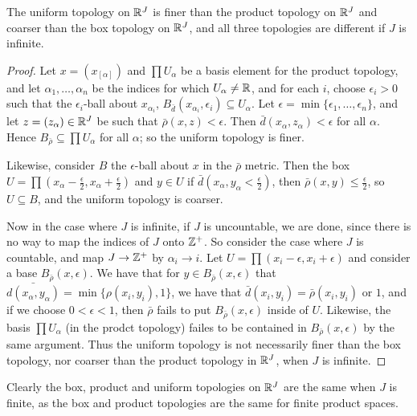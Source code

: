 \begin{theorem}\label{2.2.8}
    The uniform topology on $\mathbb{R}^J$ is finer than the product topology on  $\mathbb{R}^J$ and coarser than
    the box topology on  $\mathbb{R}^J$, and all three topologies are different if  $J$ is infinite.
\end{theorem}
\begin{proof}
    Let $x=(x_[\alpha])$ and $\prod{U_{\alpha}}$ be a basis element for the product topology, and
    let $\alpha_1 ,\dots, \alpha_n$ be the indices for which $U_{\alpha} \neq \mathbb{R}$, and for each $i$,
    choose  $\epsilon_i>0$ such that the  $\epsilon_i$-ball about  $x_{\alpha_i}$,
    $B_{\bar{d}}(x_{\alpha_i},\epsilon_i) \subseteq U_{\alpha}$. Let $\epsilon=\min\{\epsilon_1,
    \dots, \epsilon_n\}$, and let $z=(z_{\alpha}) \in \mathbb{R}^J$ be such that $\bar{\rho}(x,z)<\epsilon$.
    Then $\bar{d}(x_{\alpha},z_{\alpha})<\epsilon$ for all $\alpha$. Hence  $B_{\bar{\rho}}
    \subseteq \prod{U_{\alpha}}$ for all $\alpha$; so the uniform topology is finer.

    Likewise, consider $B$ the $\epsilon$-ball about  $x$ in the  $\bar{\rho}$ metric. Then the box
    $U=\prod{(x_{\alpha}-\frac{\epsilon}{2},x_{\alpha}+\frac{\epsilon}{2})}$ and $y \in U$ if
    $\bar{d}(x_{\alpha},y_{\alpha}<\frac{\epsilon}{2})$, then $\bar {\rho}(x,y) \leq
    \frac{\epsilon}{2}$, so $U \subseteq B$, and the uniform topology is coarser.

    Now in the case where  $J$ is infinite, if  $J$ is uncountable, we are done, since there is no
    way to map the indices of  $J$ onto  $\mathbb{Z}^+$. So consider the case where  $J$ is countable, and
    map  $J \rightarrow \mathbb{Z}^+$ by  $\alpha_i \rightarrow i$. Let
    $U=\prod{(x_i-\epsilon,x_i+\epsilon)}$ and consider a base $B_{\bar{\rho}}(x,\epsilon)$. We have
    that for  $y \in B_{\bar{\rho}}(x,\epsilon)$ that
    $\bar{d(x_{\alpha},y_{\alpha})}=\min\{\rho(x_i,y_i),1\}$, we have that
    $\bar{d}(x_i,y_i)=\bar{\rho}(x_i,y_i)$ or $1$, and if we choose  $0<\epsilon<1$, then
    $\bar{\rho}$ fails to put $B_{\bar{\rho}}(x,\epsilon)$ inside of $U$. Likewise, the basis
    $\prod{U_{\alpha}}$ (in the prodct topology) failes to be contained in
    $B_{\bar{\rho}}(x,\epsilon)$ by the same argument. Thus the uniform topology is not necessarily finer than
    the box topology, nor coarser than the product topology in $\mathbb{R}^J$, when $J$ is infinite.
\end{proof}
\begin{remark}
    Clearly the box, product and uniform topologies on $\mathbb{R}^J$ are the same when  $J$ is finite, as
    the box and product topologies are the same for finite product spaces.
\end{remark}

